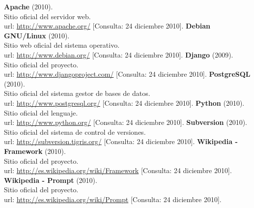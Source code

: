 \begin{thebibliography}{xx}

 \textbf{Apache} (2010).\\
        Sitio oficial del servidor web.\\
        url: \url{http://www.apache.org/}
        [Consulta: 24 diciembre 2010].
 \textbf{Debian GNU/Linux} (2010).\\
         Sitio web oficial del sistema operativo.\\
         url: \url{http://www.debian.org/}
         [Consulta: 24 diciembre 2010].
 \textbf{Django} (2009).\\
         Sitio oficial del proyecto.\\
         url: \url{http://www.djangoproject.com/}
         [Consulta: 24 diciembre 2010].
 \textbf{PostgreSQL} (2010).\\
         Sitio oficial del sistema gestor de bases de datos.\\
         url: \url{http://www.postgresql.org/}
         [Consulta: 24 diciembre 2010].
 \textbf{Python} (2010).\\
         Sitio oficial del lenguaje.\\
         url: \url{http://www.python.org/}
         [Consulta: 24 diciembre 2010].
 \textbf{Subversion} (2010).\\
         Sitio oficial del sistema de control de versiones.\\
         url: \url{http://subversion.tigris.org/}
         [Consulta: 24 diciembre 2010].
 \textbf{Wikipedia - Framework} (2010).\\
         Sitio oficial del proyecto.\\
         url: \url{http://es.wikipedia.org/wiki/Framework}
         [Consulta: 24 diciembre 2010].
 \textbf{Wikipedia - Prompt} (2010).\\
         Sitio oficial del proyecto.\\
         url: \url{http://es.wikipedia.org/wiki/Prompt}
         [Consulta: 24 diciembre 2010].

 \end{thebibliography}
